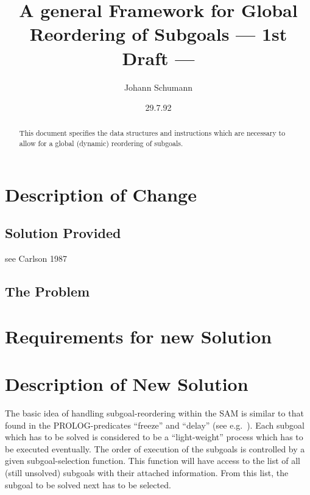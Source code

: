 

\title{A general Framework for Global Reordering of Subgoals
--- 1st Draft ---}
\author{Johann Schumann}
\date{29.7.92}



\maketitle

\begin{abstract}
This document specifies the data structures and instructions which
are necessary to allow for a global (dynamic) reordering of subgoals.

\end{abstract}

\section{Description of Change}

\subsection{Solution Provided}

see Carlson 1987

\subsection{The Problem}

\section{Requirements for new Solution}

\section{Description of New Solution}

The basic idea of handling subgoal-reordering within the SAM is similar to
that found in the PROLOG-predicates ``freeze'' and ``delay'' (see e.g.\ \cite{Carl87}).
Each subgoal  which has to be solved is considered to be a ``light-weight'' process which has to be executed eventually.
The order of execution of the subgoals is controlled by a given
subgoal-selection function. This function will have access to the list of
all (still unsolved) subgoals with their attached information. From this list,
the subgoal to be solved next has to be selected.

